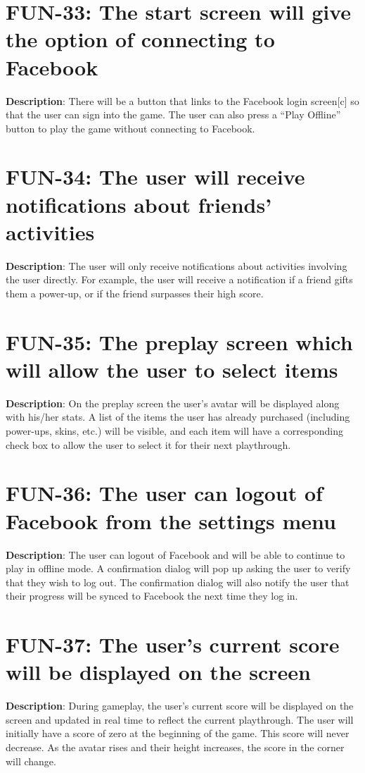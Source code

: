 \section{FUN-33: The start screen will give the option of connecting to Facebook}
\textbf{Description}: There will be a button that links to the Facebook
login screen{[}c{]} so that the user can sign into the game. The user
can also press a \textquotedblleft{}Play Offline\textquotedblright{}
button to play the game without connecting to Facebook.
\section{FUN-34: The user will receive notifications about friends\textquoteright{}
activities}
\textbf{Description}: The user will only receive notifications about
activities involving the user directly. For example, the user will
receive a notification if a friend gifts them a power-up, or if the
friend surpasses their high score.
\section{FUN-35: The preplay screen which will allow the user to select items}
\textbf{Description}: On the preplay screen the user\textquoteright{}s
avatar will be displayed along with his/her stats. A list of the items
the user has already purchased (including power-ups, skins, etc.)
will be visible, and each item will have a corresponding check box
to allow the user to select it for their next playthrough.
\section{FUN-36: The user can logout of Facebook from the settings menu}
\textbf{Description}: The user can logout of Facebook and will be
able to continue to play in offline mode. A confirmation dialog will
pop up asking the user to verify that they wish to log out. The confirmation
dialog will also notify the user that their progress will be synced
to Facebook the next time they log in.
\section{FUN-37: The user\textquoteright{}s current score will be displayed
on the screen}
\textbf{Description}: During gameplay, the user\textquoteright{}s
current score will be displayed on the screen and updated in real
time to reflect the current playthrough. The user will initially have
a score of zero at the beginning of the game. This score will never
decrease. As the avatar rises and their height increases, the score
in the corner will change. 
